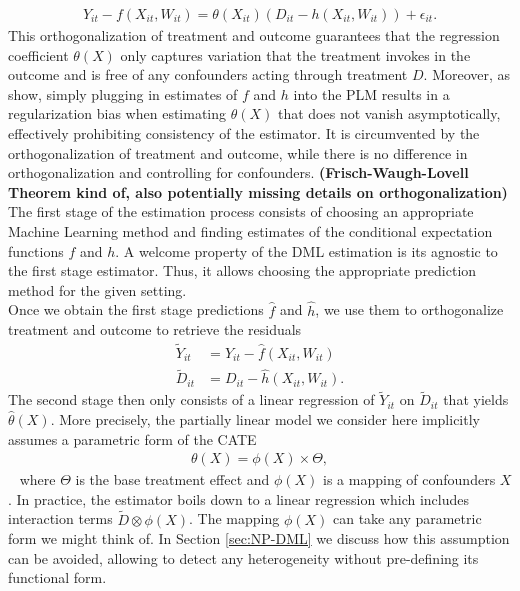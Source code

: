 \begin{align*}
    Y_{it}-f(X_{it}, W_{it})=\theta(X_{it})(D_{it} - h(X_{it}, W_{it}))+\epsilon_{it}.
\end{align*}
This orthogonalization of treatment and outcome guarantees that the regression coefficient $\theta(X)$ only captures variation that the treatment invokes in the outcome and is free of any confounders acting through treatment $D$. Moreover, as \cite{DML2017} show, simply plugging in estimates of $f$ and $h$ into the PLM results in a regularization bias when estimating $\theta(X)$ that does not vanish asymptotically, effectively prohibiting consistency of the estimator. It is circumvented by the orthogonalization of treatment and outcome, while there is no difference in orthogonalization and controlling for confounders. \textbf{(Frisch-Waugh-Lovell Theorem kind of, also potentially missing details on orthogonalization)} \\
The first stage of the estimation process consists of choosing an appropriate Machine Learning method and finding estimates of the conditional expectation functions $f$ and $h$. A welcome property of the DML estimation is its agnostic to the first stage estimator. Thus, it allows choosing the appropriate prediction method for the given setting. \\
Once we obtain the first stage predictions $\hat{f}$ and $\hat{h}$, we use them to orthogonalize treatment and outcome to retrieve the residuals 
\begin{align*} 
    \tilde{Y}_{it}&=Y_{it}-\hat{f}(X_{it}, W_{it}) \\ 
    \tilde{D}_{it}&=D_{it}-\hat{h}(X_{it}, W_{it}).
\end{align*}
The second stage then only consists of a linear regression of $\tilde{Y}_{it}$ on $\tilde{D}_{it}$ that yields $\hat{\theta}(X)$. More precisely, the partially linear model we consider here implicitly assumes a parametric form of the CATE 
\begin{align*} 
    \theta(X)=\phi(X) \times \Theta,
\end{align*} 
where $\Theta$ is the base treatment effect and $\phi(X)$ is a mapping of confounders $X$. In practice, the estimator boils down to a linear regression which includes interaction terms $\tilde{D} \otimes \phi(X)$. The mapping $\phi(X)$ can take any parametric form we might think of. In Section \ref{sec:NP-DML} we discuss how this assumption can be avoided, allowing to detect any heterogeneity without pre-defining its functional form. 

